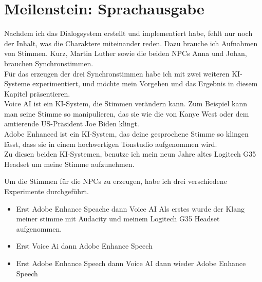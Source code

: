 \section {Meilenstein: Sprachausgabe}
Nachdem ich das Dialogsystem erstellt und implementiert habe, fehlt nur noch der Inhalt, was die Charaktere miteinander reden. Dazu brauche ich Aufnahmen von Stimmen. Kurz, Martin Luther sowie die beiden NPCs Anna und Johan, brauchen Synchronstimmen.
\\
Für das erzeugen der drei Synchronstimmen habe ich mit zwei weiteren KI-Systeme experimentiert, und möchte mein Vorgehen und das Ergebnis in diesem Kapitel präsentieren.
\\
Voice AI ist ein KI-System, die Stimmen verändern kann. Zum Beispiel kann man seine Stimme so manipulieren, das sie wie die von Kanye West oder dem amtierende US-Präsident Joe Biden klingt.
\\
Adobe Enhanced ist ein KI-System, das deine gesprochene Stimme so klingen lässt, dass sie in einem hochwertigen Tonstudio aufgenommen wird.
\\
Zu diesen beiden KI-Systemen, benutze ich mein neun Jahre altes Logitech G35 Headset um meine Stimme aufzunehmen.

Um die Stimmen für die NPCs zu erzeugen, habe ich drei verschiedene Experimente durchgeführt.
\\
\begin{itemize}
	
	\item Erst Adobe Enhance Speache dann Voice AI
	Als erstes wurde der Klang meiner stimme mit Audacity und meinem Logitech G35 Headset aufgenommen.
	\item Erst Voice Ai dann Adobe Enhance Speech
	\item Erst Adobe Enhance Speech dann Voice AI dann wieder Adobe Enhance Speech
\end{itemize} 
